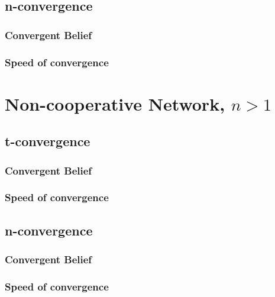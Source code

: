 \documentclass{article}
\begin{document}
\subsection{n-convergence}
\subsubsection{Convergent Belief}
\subsubsection{Speed of convergence}

\section{Non-cooperative Network, $n>1$}
\subsection{t-convergence}
\subsubsection{Convergent Belief}
\subsubsection{Speed of convergence}
\subsection{n-convergence}
\subsubsection{Convergent Belief}
\subsubsection{Speed of convergence}

\newpage
\end{document}
